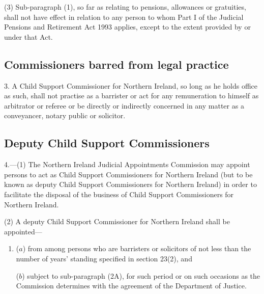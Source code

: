 \documentclass[a4paper]{article}
\begin{document}
(3) Sub-paragraph (1), so far as relating to pensions, allowances or gratuities, shall not have effect in relation to any person to whom Part I of the Judicial Pensions and Retirement Act 1993 applies, except to the extent provided by or under that Act.


\subsection*{Commissioners barred from legal practice}

3. A Child Support Commissioner for Northern Ireland, so long as he holds office as such, shall not practise as a barrister or act for any remuneration to himself as arbitrator or referee or be directly or indirectly concerned in any matter as a conveyancer, notary public or solicitor.


\subsection*{Deputy Child Support Commissioners}

4.—(1) The Northern Ireland Judicial Appointments Commission may appoint persons to act as Child Support Commissioners for Northern Ireland (but to be known as deputy Child Support Commissioners for Northern Ireland) in order to facilitate the disposal of the business of Child Support Commissioners for Northern Ireland.

(2) A deputy Child Support Commissioner for Northern Ireland shall be appointed---
\begin{enumerate}\item[]
($a$) from among persons who are barristers or solicitors of not less than the number
of years’ standing specified in section 23(2), and

($b$) subject to sub-paragraph (2A), for such period or on such occasions as
the Commission determines with the agreement of the Department of Justice.
\end{enumerate}
\end{document}

